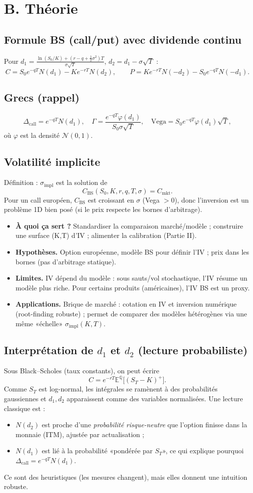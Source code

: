 \documentclass[11pt,a4paper]{report}
\theoremstyle{definition}
\theoremstyle{plain}
\theoremstyle{remark}
\newcommand{\E}{\mathbb{E}}
\newcommand{\1}{\mathbf{1}}
\newcommand{\Normal}{\mathcal{N}}
\newcommand{\Qmeas}{\mathbb{Q}}
\newcommand{\qa}[4]{
\begin{itemize}[leftmargin=*]
\item \textbf{À quoi ça sert ?} #1
\item \textbf{Hypothèses.} #2
\item \textbf{Limites.} #3
\item \textbf{Applications.} #4
\end{itemize}
}
\begin{document}
\section{B. Théorie}
\subsection*{Formule BS (call/put) avec dividende continu}
Pour $d_1=\frac{\ln(S_0/K)+(r-q+\tfrac12\sigma^2)T}{\sigma\sqrt{T}}$, $d_2=d_1-\sigma\sqrt{T}$ :
\[
C = S_0e^{-qT}N(d_1)-Ke^{-rT}N(d_2),\qquad
P = Ke^{-rT}N(-d_2)-S_0e^{-qT}N(-d_1).
\]

\subsection*{Grecs (rappel)}
\[
\Delta_{\text{call}}=e^{-qT}N(d_1),\quad
\Gamma = \frac{e^{-qT}\varphi(d_1)}{S_0\sigma\sqrt{T}},\quad
\text{Vega}=S_0e^{-qT}\varphi(d_1)\sqrt{T},
\]
où $\varphi$ est la densité $\Normal(0,1)$.

\subsection*{Volatilité implicite}
Définition : $\sigma_{\text{impl}}$ est la solution de
\[
C_{\text{BS}}(S_0,K,r,q,T,\sigma)=C_{\text{mkt}}.
\]
Pour un call européen, $C_{\text{BS}}$ est croissant en $\sigma$ (Vega $>0$), donc l'inversion est un problème 1D bien posé (si le prix respecte les bornes d'arbitrage).

\qa
{Standardiser la comparaison marché/modèle ; construire une surface (K,T) d'IV ; alimenter la calibration (Partie II).}
{Option européenne, modèle BS pour définir l'IV ; prix dans les bornes (pas d'arbitrage statique).}
{IV dépend du modèle : sous sauts/vol stochastique, l'IV résume un modèle plus riche. Pour certains produits (américaines), l'IV BS est un proxy.}
{Brique de marché : cotation en IV et inversion numérique (root-finding robuste) ; permet de comparer des modèles hétérogènes via une même «échelle» $\sigma_{\text{impl}}(K,T)$.}

\subsection*{Interprétation de $d_1$ et $d_2$ (lecture probabiliste)}
Sous Black--Scholes (taux constants), on peut écrire
\[
C = e^{-rT}\E^{\Qmeas}\big[(S_T-K)^+\big].
\]
Comme $S_T$ est log-normal, les intégrales se ramènent à des probabilités gaussiennes et $d_1,d_2$ apparaissent comme des variables normalisées.
Une lecture classique est :
\begin{itemize}[leftmargin=*]
\item $N(d_2)$ est proche d'une \emph{probabilité risque-neutre} que l'option finisse dans la monnaie (ITM), ajustée par actualisation ;
\item $N(d_1)$ est lié à la probabilité «pondérée par $S_T$», ce qui explique pourquoi $\Delta_{\text{call}}=e^{-qT}N(d_1)$.
\end{itemize}
Ce sont des heuristiques (les mesures changent), mais elles donnent une intuition robuste.
\end{document}
